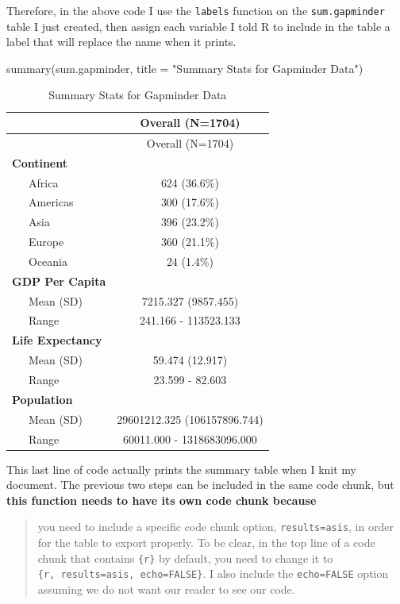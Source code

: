 \documentclass[
]{book}
\makeatletter
\newenvironment{Shaded}{\begin{snugshade}}{\end{snugshade}}
\newcommand{\AttributeTok}[1]{\textcolor[rgb]{0.61,0.61,0.61}{#1}}
\newcommand{\FunctionTok}[1]{\textcolor[rgb]{0,0,0}{#1}}
\newcommand{\NormalTok}[1]{#1}
\newcommand{\StringTok}[1]{\textcolor[rgb]{0.5,0.5,0.5}{#1}}
\newenvironment{kframe}{%
\medskip{}
\setlength{\fboxsep}{.8em}
 \def\at@end@of@kframe{}%
 \ifinner\ifhmode%
  \def\at@end@of@kframe{\end{minipage}}%
  \begin{minipage}{\columnwidth}%
 \fi\fi%
 \def\FrameCommand##1{\hskip\@totalleftmargin \hskip-\fboxsep
 \colorbox{shadecolor}{##1}\hskip-\fboxsep
     \hskip-\linewidth \hskip-\@totalleftmargin \hskip\columnwidth}%
 \MakeFramed {\advance\hsize-\width
   \@totalleftmargin\z@ \linewidth\hsize
   \@setminipage}}%
 {\par\unskip\endMakeFramed%
 \at@end@of@kframe}
\renewenvironment{Shaded}{\begin{kframe}}{\end{kframe}}
\makeatother
\begin{document}
Therefore, in the above code I use the \texttt{labels} function on the \texttt{sum.gapminder} table I just created, then assign each variable I told R to include in the table a label that will replace the name when it prints.

\begin{Shaded}
\begin{Highlighting}[]
\FunctionTok{summary}\NormalTok{(sum.gapminder, }\AttributeTok{title =} \StringTok{"Summary Stats for Gapminder Data"}\NormalTok{)}
\end{Highlighting}
\end{Shaded}

\begin{longtable}[]{@{}lc@{}}
\caption{Summary Stats for Gapminder Data}\tabularnewline
\toprule
& Overall (N=1704) \\
\midrule
\endfirsthead
\toprule
& Overall (N=1704) \\
\midrule
\endhead
\textbf{Continent} & \\
~~~Africa & 624 (36.6\%) \\
~~~Americas & 300 (17.6\%) \\
~~~Asia & 396 (23.2\%) \\
~~~Europe & 360 (21.1\%) \\
~~~Oceania & 24 (1.4\%) \\
\textbf{GDP Per Capita} & \\
~~~Mean (SD) & 7215.327 (9857.455) \\
~~~Range & 241.166 - 113523.133 \\
\textbf{Life Expectancy} & \\
~~~Mean (SD) & 59.474 (12.917) \\
~~~Range & 23.599 - 82.603 \\
\textbf{Population} & \\
~~~Mean (SD) & 29601212.325 (106157896.744) \\
~~~Range & 60011.000 - 1318683096.000 \\
\bottomrule
\end{longtable}

This last line of code actually prints the summary table when I knit my document. The previous two steps can be included in the same code chunk, but \textbf{this function needs to have its own code chunk because}

\begin{quote}
you need to include a specific code chunk option, \texttt{results=\textquotesingle{}asis\textquotesingle{}}, in order for the table to export properly. To be clear, in the top line of a code chunk that contains \texttt{\{r\}} by default, you need to change it to \texttt{\{r,\ results=\textquotesingle{}asis\textquotesingle{},\ echo=FALSE\}}. I also include the \texttt{echo=FALSE} option assuming we do not want our reader to see our code.
\end{quote}
\end{document}
